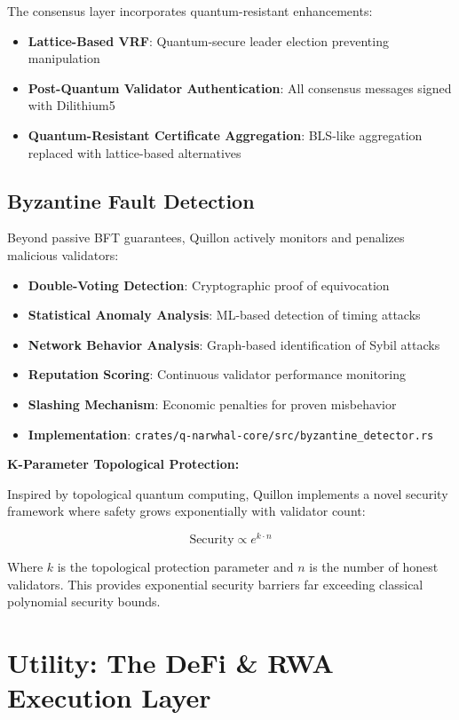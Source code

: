 \documentclass[11pt,a4paper]{scrartcl}
\begin{document}
The consensus layer incorporates quantum-resistant enhancements:

\begin{itemize}
\item \textbf{Lattice-Based VRF}: Quantum-secure leader election preventing manipulation
\item \textbf{Post-Quantum Validator Authentication}: All consensus messages signed with Dilithium5
\item \textbf{Quantum-Resistant Certificate Aggregation}: BLS-like aggregation replaced with lattice-based alternatives
\end{itemize}

\subsection{Byzantine Fault Detection}

Beyond passive BFT guarantees, Quillon actively monitors and penalizes malicious validators:

\begin{itemize}
\item \textbf{Double-Voting Detection}: Cryptographic proof of equivocation
\item \textbf{Statistical Anomaly Analysis}: ML-based detection of timing attacks
\item \textbf{Network Behavior Analysis}: Graph-based identification of Sybil attacks
\item \textbf{Reputation Scoring}: Continuous validator performance monitoring
\item \textbf{Slashing Mechanism}: Economic penalties for proven misbehavior
\item \textbf{Implementation}: \texttt{crates/q-narwhal-core/src/byzantine\_detector.rs}
\end{itemize}

\textbf{K-Parameter Topological Protection:}

Inspired by topological quantum computing, Quillon implements a novel security framework where safety grows exponentially with validator count:

\[
\text{Security} \propto e^{k \cdot n}
\]

Where $k$ is the topological protection parameter and $n$ is the number of honest validators. This provides exponential security barriers far exceeding classical polynomial security bounds.

\newpage

\section{Utility: The DeFi \& RWA Execution Layer}
\end{document}
